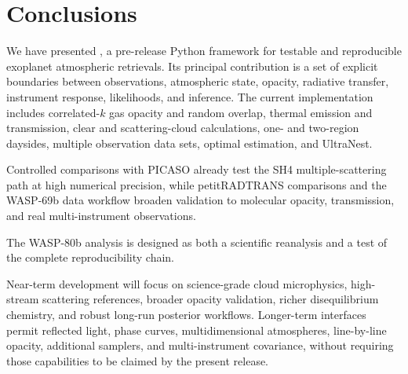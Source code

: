 \section{Conclusions}
\label{sec:conclusions}

We have presented \ROBERT{}, a pre-release Python framework for testable and
reproducible exoplanet atmospheric retrievals. Its principal contribution is a
set of explicit boundaries between observations, atmospheric state, opacity,
radiative transfer, instrument response, likelihoods, and inference. The
current implementation includes correlated-$k$ gas opacity and random overlap,
thermal emission and transmission, clear and scattering-cloud calculations,
one- and two-region daysides, multiple observation data sets, optimal
estimation, and UltraNest.

Controlled comparisons with PICASO already test the SH4 multiple-scattering
path at high numerical precision, while petitRADTRANS comparisons and the
WASP-69b data workflow broaden validation to molecular opacity, transmission,
and real multi-instrument observations. 

The WASP-80b analysis is designed as both a scientific reanalysis and a test of
the complete reproducibility chain. 

Near-term development will focus on science-grade cloud microphysics,
high-stream scattering references, broader opacity validation, richer
disequilibrium chemistry, and robust long-run posterior workflows. Longer-term
interfaces permit reflected light, phase curves, multidimensional atmospheres,
line-by-line opacity, additional samplers, and multi-instrument covariance,
without requiring those capabilities to be claimed by the present release.

